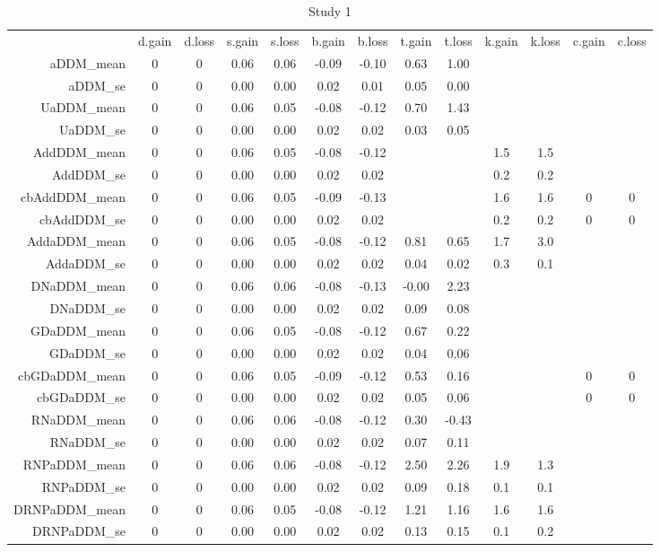 \begin{table}[ht]
\centering
\begin{tabular}{|r|cc|cc|cc|cc|cc|cc|}
  & d.gain & d.loss & s.gain & s.loss & b.gain & b.loss & t.gain & t.loss & k.gain & k.loss & c.gain & c.loss \\ 
 aDDM\_mean & 0 & 0 & 0.06 & 0.06 & -0.09 & -0.10 & 0.63 & 1.00 &  &  &  &  \\ 
  aDDM\_se & 0 & 0 & 0.00 & 0.00 & 0.02 & 0.01 & 0.05 & 0.00 &  &  &  &  \\ 
   \hline
UaDDM\_mean & 0 & 0 & 0.06 & 0.05 & -0.08 & -0.12 & 0.70 & 1.43 &  &  &  &  \\ 
  UaDDM\_se & 0 & 0 & 0.00 & 0.00 & 0.02 & 0.02 & 0.03 & 0.05 &  &  &  &  \\ 
   \hline
AddDDM\_mean & 0 & 0 & 0.06 & 0.05 & -0.08 & -0.12 &  &  & 1.5 & 1.5 &  &  \\ 
  AddDDM\_se & 0 & 0 & 0.00 & 0.00 & 0.02 & 0.02 &  &  & 0.2 & 0.2 &  &  \\ 
   \hline
cbAddDDM\_mean & 0 & 0 & 0.06 & 0.05 & -0.09 & -0.13 &  &  & 1.6 & 1.6 & 0 & 0 \\ 
  cbAddDDM\_se & 0 & 0 & 0.00 & 0.00 & 0.02 & 0.02 &  &  & 0.2 & 0.2 & 0 & 0 \\ 
   \hline
AddaDDM\_mean & 0 & 0 & 0.06 & 0.05 & -0.08 & -0.12 & 0.81 & 0.65 & 1.7 & 3.0 &  &  \\ 
  AddaDDM\_se & 0 & 0 & 0.00 & 0.00 & 0.02 & 0.02 & 0.04 & 0.02 & 0.3 & 0.1 &  &  \\ 
   \hline
DNaDDM\_mean & 0 & 0 & 0.06 & 0.06 & -0.08 & -0.13 & -0.00 & 2.23 &  &  &  &  \\ 
  DNaDDM\_se & 0 & 0 & 0.00 & 0.00 & 0.02 & 0.02 & 0.09 & 0.08 &  &  &  &  \\ 
   \hline
GDaDDM\_mean & 0 & 0 & 0.06 & 0.05 & -0.08 & -0.12 & 0.67 & 0.22 &  &  &  &  \\ 
  GDaDDM\_se & 0 & 0 & 0.00 & 0.00 & 0.02 & 0.02 & 0.04 & 0.06 &  &  &  &  \\ 
   \hline
cbGDaDDM\_mean & 0 & 0 & 0.06 & 0.05 & -0.09 & -0.12 & 0.53 & 0.16 &  &  & 0 & 0 \\ 
  cbGDaDDM\_se & 0 & 0 & 0.00 & 0.00 & 0.02 & 0.02 & 0.05 & 0.06 &  &  & 0 & 0 \\ 
   \hline
RNaDDM\_mean & 0 & 0 & 0.06 & 0.06 & -0.08 & -0.12 & 0.30 & -0.43 &  &  &  &  \\ 
  RNaDDM\_se & 0 & 0 & 0.00 & 0.00 & 0.02 & 0.02 & 0.07 & 0.11 &  &  &  &  \\ 
   \hline
RNPaDDM\_mean & 0 & 0 & 0.06 & 0.06 & -0.08 & -0.12 & 2.50 & 2.26 & 1.9 & 1.3 &  &  \\ 
  RNPaDDM\_se & 0 & 0 & 0.00 & 0.00 & 0.02 & 0.02 & 0.09 & 0.18 & 0.1 & 0.1 &  &  \\ 
   \hline
DRNPaDDM\_mean & 0 & 0 & 0.06 & 0.05 & -0.08 & -0.12 & 1.21 & 1.16 & 1.6 & 1.6 &  &  \\ 
  DRNPaDDM\_se & 0 & 0 & 0.00 & 0.00 & 0.02 & 0.02 & 0.13 & 0.15 & 0.1 & 0.2 &  &  \\ 
   \hline
\end{tabular}
\caption{Study 1} 
\end{table}
